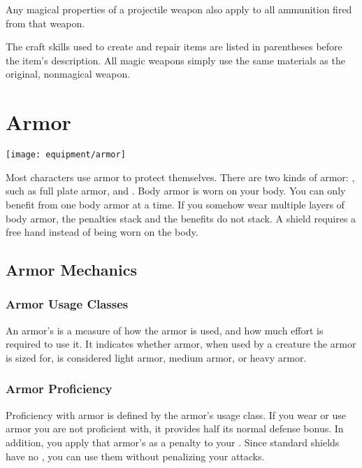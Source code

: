     Any magical properties of a projectile weapon also apply to all ammunition fired from that weapon.

     The craft skills used to create and repair items are listed in parentheses before the item's description.
    All magic weapons simply use the same materials as the original, nonmagical weapon.

    

    

\newpage
\section{Armor}\label{Armor}
    \texttt{[image: equipment/armor]}

    Most characters use armor to protect themselves. There are two kinds of armor: , such as full plate armor, and .
    Body armor is worn on your body.
    You can only benefit from one body armor at a time.
    If you somehow wear multiple layers of body armor, the penalties stack and the benefits do not stack.
    A shield requires a free hand instead of being worn on the body.

    \subsection{Armor Mechanics}

        \subsubsection{Armor Usage Classes}\label{Armor Usage Classes}
            An armor's  is a measure of how the armor is used, and how much effort is required to use it.
            It indicates whether armor, when used by a creature the armor is sized for, is considered light armor, medium armor, or heavy armor.

        \subsubsection{Armor Proficiency}\label{Armor Proficiency}
            Proficiency with armor is defined by the armor's usage class.
            If you wear or use armor you are not proficient with, it provides half its normal defense bonus.
            In addition, you apply that armor's  as a penalty to your .
            Since standard shields have no , you can use them without penalizing your attacks.

